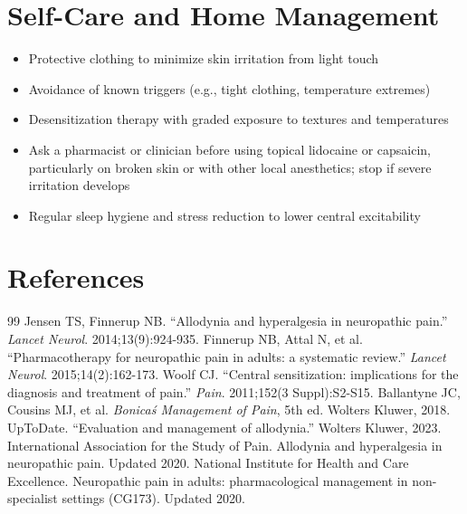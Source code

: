\section*{Self-Care and Home Management}
\begin{itemize}
 \item Protective clothing to minimize skin irritation from light touch
 \item Avoidance of known triggers (e.g., tight clothing, temperature extremes)
 \item Desensitization therapy with graded exposure to textures and temperatures
 \item Ask a pharmacist or clinician before using topical lidocaine or capsaicin, particularly on broken skin or with other local anesthetics; stop if severe irritation develops
 \item Regular sleep hygiene and stress reduction to lower central excitability
\end{itemize}

\section*{References}
\begin{thebibliography}{99}
 Jensen TS, Finnerup NB. ``Allodynia and hyperalgesia in neuropathic pain.'' \textit{Lancet Neurol}. 2014;13(9):924-935.
 Finnerup NB, Attal N, et al. ``Pharmacotherapy for neuropathic pain in adults: a systematic review.'' \textit{Lancet Neurol}. 2015;14(2):162-173.
 Woolf CJ. ``Central sensitization: implications for the diagnosis and treatment of pain.'' \textit{Pain}. 2011;152(3 Suppl):S2-S15.
 Ballantyne JC, Cousins MJ, et al. \textit{Bonica\'s Management of Pain}, 5th ed. Wolters Kluwer, 2018.
 UpToDate. ``Evaluation and management of allodynia.'' Wolters Kluwer, 2023.
 International Association for the Study of Pain. Allodynia and hyperalgesia in neuropathic pain. Updated 2020.
 National Institute for Health and Care Excellence. Neuropathic pain in adults: pharmacological management in non-specialist settings (CG173). Updated 2020.
\end{thebibliography}
